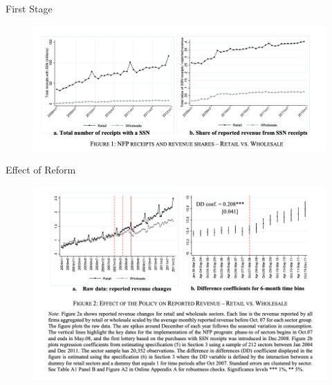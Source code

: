 \documentclass{beamer}
\begin{document}
\begin{frame}{First Stage}
\begin{figure}
    \centering
    \includegraphics[width=\textwidth]{Paper Presentations/Consumers as Tax Auditors/F1.png}
    \label{fig:enter-label}
\end{figure}
\end{frame}

\begin{frame}{Effect of Reform}
\begin{figure}
    \centering
    \includegraphics[width=\textwidth]{Paper Presentations/Consumers as Tax Auditors/Impact.png}
    \label{fig:enter-label}
\end{figure}
\end{frame}
\end{document}
